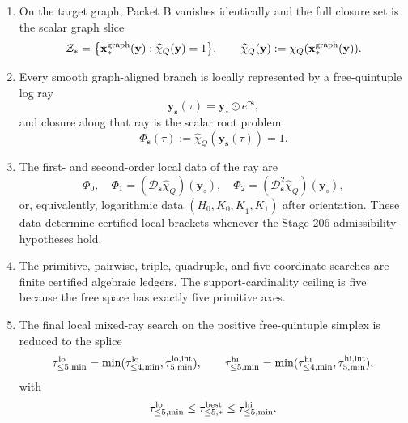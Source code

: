 \begin{theorem}
\begin{enumerate}[leftmargin=2.2em]
  \item On the target graph, Packet B vanishes identically and the full closure set is the scalar graph slice
  \begin{equation}
  \label{eq:part06-main-graph-slice}
  \mathcal Z_*
  =
  \bigl\{\mathbf x_*^{\rm graph}(\mathbf y):\widehat\chi_Q(\mathbf y)=1\bigr\},
  \qquad
  \widehat\chi_Q(\mathbf y):=\chi_Q(\mathbf x_*^{\rm graph}(\mathbf y)).
  \end{equation}
  \item Every smooth graph-aligned branch is locally represented by a free-quintuple log ray
  \begin{equation}
  \label{eq:part06-main-logray}
  \mathbf y_{\mathbf s}(\tau)=\mathbf y_\circ\odot e^{\tau\mathbf s},
  \end{equation}
  and closure along that ray is the scalar root problem
  \begin{equation}
  \label{eq:part06-main-scalar-root}
  \Phi_{\mathbf s}(\tau):=\widehat\chi_Q(\mathbf y_{\mathbf s}(\tau))=1.
  \end{equation}
  \item The first- and second-order local data of the ray are
  \begin{equation}
  \label{eq:part06-main-hessian-data}
  \Phi_0,
  \quad
  \Phi_1=(\mathcal D_{\mathbf s}\widehat\chi_Q)(\mathbf y_\circ),
  \quad
  \Phi_2=(\mathcal D_{\mathbf s}^2\widehat\chi_Q)(\mathbf y_\circ),
  \end{equation}
  or, equivalently, logarithmic data \((H_0,K_0,\underline K_1,\overline K_1)\) after orientation.  These data determine certified local brackets whenever the Stage 206 admissibility hypotheses hold.
  \item The primitive, pairwise, triple, quadruple, and five-coordinate searches are finite certified algebraic ledgers.  The support-cardinality ceiling is five because the free space has exactly five primitive axes.
  \item The final local mixed-ray search on the positive free-quintuple simplex is reduced to the splice
  \begin{equation}
  \label{eq:part06-main-final-splice}
  \tau_{\le5,\min}^{\rm lo}
  =
  \min(\tau_{\le4,\min}^{\rm lo},\tau_{5,\min}^{\rm lo,int}),
  \qquad
  \tau_{\le5,\min}^{\rm hi}
  =
  \min(\tau_{\le4,\min}^{\rm hi},\tau_{5,\min}^{\rm hi,int}),
  \end{equation}
  with
  \begin{equation}
  \label{eq:part06-main-final-bound}
  \tau_{\le5,\min}^{\rm lo}
  \le
  \tau_{\le5,*}^{\rm best}
  \le
  \tau_{\le5,\min}^{\rm hi}.
  \end{equation}
\end{enumerate}
\end{theorem}


